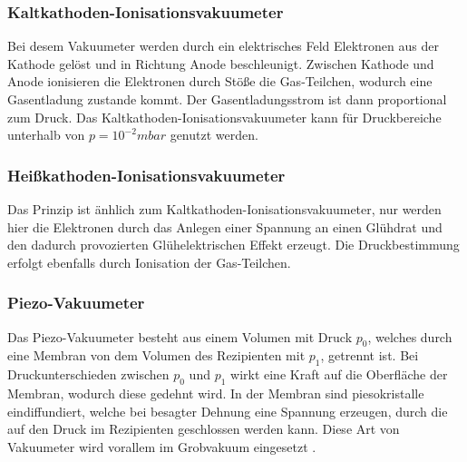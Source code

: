 \subsubsection{Kaltkathoden-Ionisationsvakuumeter}
Bei desem Vakuumeter werden durch ein elektrisches Feld Elektronen aus der Kathode gelöst und in Richtung Anode beschleunigt.
Zwischen Kathode und Anode ionisieren die Elektronen durch Stöße die Gas-Teilchen, wodurch eine Gasentladung zustande kommt.
Der Gasentladungsstrom ist dann proportional zum Druck.
Das Kaltkathoden-Ionisationsvakuumeter kann für Druckbereiche unterhalb von $p = 10^{-2} mbar$ genutzt werden\cite{Pfeiffer, S.94}.

\subsubsection{Heißkathoden-Ionisationsvakuumeter}
Das Prinzip ist änhlich zum Kaltkathoden-Ionisationsvakuumeter, nur werden hier die Elektronen durch das Anlegen einer Spannung an einen Glühdrat und den dadurch provozierten 
Glühelektrischen Effekt erzeugt. Die Druckbestimmung erfolgt ebenfalls durch Ionisation der Gas-Teilchen\cite{Pfeiffer, S.94,95}.

\subsubsection{Piezo-Vakuumeter}
Das Piezo-Vakuumeter besteht aus einem Volumen mit Druck $p_0$, welches durch eine Membran von dem Volumen des Rezipienten mit $p_1$, getrennt ist.
Bei Druckunterschieden zwischen $p_0$ und $p_1$ wirkt eine Kraft auf die Oberfläche der Membran, wodurch diese gedehnt wird. In der Membran sind 
piesokristalle eindiffundiert, welche bei besagter Dehnung eine Spannung erzeugen, durch die auf den Druck im Rezipienten geschlossen werden kann.
Diese Art von Vakuumeter wird vorallem im Grobvakuum eingesetzt \cite{Pfeiffer, S.92}.
















